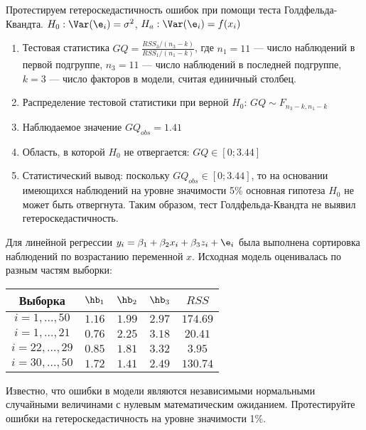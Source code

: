 \documentclass[pdftex,11pt,openany]{book}\usepackage[]{graphicx}\usepackage[]{color}
\begin{document}
\begin{solution}
Протестируем гетероскедастичность ошибок при помощи теста Голдфельда-
Квандта. $H_0: \Var(\e_i)=\sigma^2$, $H_a: \Var(\e_i)=f(x_i)$

\begin{enumerate}
\item Тестовая статистика $GQ=\frac{RSS_3/(n_3-k)}{RSS_1/(n_1-k)}$, где $n_1=11$ --- число наблюдений в первой подгруппе, $n_3=11$ --- число наблюдений в
последней подгруппе, $k=3$ --- число факторов в модели, считая единичный столбец.
\item Распределение тестовой статистики при верной $H_0$: $GQ\sim F_{n_3-k,n_1-k}$
\item Наблюдаемое значение $GQ_{obs}=1.41$
\item Область, в которой $H_0$ не отвергается: $GQ\in [0;3.44]$
\item Статистический вывод: поскольку $GQ_{obs} \in [0;3.44]$, то на основании имеющихся наблюдений на уровне значимости 5\% основная гипотеза $H_0$ не может быть отвергнута. Таким образом, тест Голдфельда-Квандта не выявил гетероскедастичность.
\end{enumerate}
\end{solution}


\begin{problem}
Для линейной регрессии $y_i = \beta_1 + \beta_2 x_i + \beta_3 z_i + \e_i$ была
выполнена сортировка наблюдений по возрастанию переменной $x$. Исходная модель оценивалась по разным частям выборки:

\begin{tabular}{c|cccc}
Выборка & $\hb_1$ & $\hb_2$ & $\hb_3$ & $RSS$ \\
\hline
$i=1,\ldots, 50$ & $1.16$ & $1.99$ & $2.97$ & $174.69$ \\
$i=1,\ldots, 21$ & $0.76$ & $2.25$ & $3.18$ & $20.41$ \\
$i=22,\ldots, 29$ & $0.85$ & $1.81$ & $3.32$ & $3.95$ \\
$i=30,\ldots, 50$ & $1.72$ & $1.41$ & $2.49$ & $130.74$ \\
\end{tabular}

Известно, что ошибки в модели являются независимыми нормальными случайными величинами с нулевым математическим ожиданием. Протестируйте
ошибки на гетероскедастичность на уровне значимости 1\%.
\end{problem}
\end{document}
